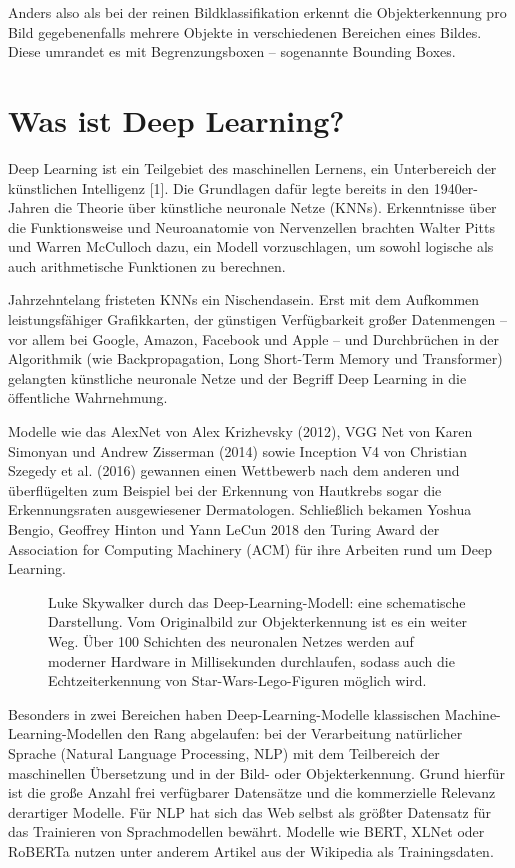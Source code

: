 Anders also als bei der reinen Bildklassifikation erkennt die Objekterkennung pro Bild gegebenenfalls mehrere Objekte in verschiedenen Bereichen eines Bildes. Diese umrandet es mit Begrenzungsboxen – sogenannte Bounding Boxes. 

\section{Was ist Deep Learning?}

Deep Learning ist ein Teilgebiet des maschinellen Lernens, ein Unterbereich der künstlichen Intelligenz [1]. Die Grundlagen dafür legte bereits in den 1940er-Jahren die Theorie über künstliche neuronale Netze (KNNs). Erkenntnisse über die Funktionsweise und Neuroanatomie von Nervenzellen brachten Walter Pitts und Warren McCulloch dazu, ein Modell vorzuschlagen, um sowohl logische als auch arithmetische Funktionen zu berechnen. 

Jahrzehntelang fristeten KNNs ein Nischendasein. Erst mit dem Aufkommen leistungsfähiger Grafikkarten, der günstigen Verfügbarkeit großer Datenmengen – vor allem bei Google, Amazon, Facebook und Apple – und Durchbrüchen in der Algorithmik (wie Backpropagation, Long Short-Term Memory und Transformer) gelangten künstliche neuronale Netze und der Begriff Deep Learning in die öffentliche Wahrnehmung. 

Modelle wie das AlexNet von Alex Krizhevsky (2012), VGG Net von Karen Simonyan und Andrew Zisserman (2014) sowie Inception V4 von Christian Szegedy et al. (2016) gewannen einen Wettbewerb nach dem anderen und überflügelten zum Beispiel bei der Erkennung von Hautkrebs sogar die Erkennungsraten ausgewiesener Dermatologen. Schließlich bekamen ­Yoshua Bengio, Geoffrey Hinton und Yann LeCun 2018 den Turing Award der Association for Computing Machinery (ACM) für ihre Arbeiten rund um Deep Learning. 


\begin{figure}
	
	
	\caption{Luke Skywalker durch das Deep-Learning-Modell: eine schematische Darstellung. Vom Originalbild zur Objekterkennung ist es ein weiter Weg. Über 100 Schichten des neuronalen Netzes werden auf moderner Hardware in Millisekunden durchlaufen, sodass auch die Echtzeiterkennung von Star-Wars-Lego-Figuren möglich wird.}
\end{figure} 


Besonders in zwei Bereichen haben Deep-Learning-Modelle klassischen Machine-Learning-Modellen den Rang abgelaufen: bei der Verarbeitung natürlicher Sprache (Natural Language Processing, NLP) mit dem Teilbereich der maschinellen Übersetzung und in der Bild- oder Objekterkennung. Grund hierfür ist die große Anzahl frei verfügbarer Datensätze und die kommerzielle Relevanz derartiger Modelle. Für NLP hat sich das Web selbst als größter Datensatz für das Trainieren von Sprachmodellen bewährt. Modelle wie BERT, XLNet oder RoBERTa nutzen unter anderem Artikel aus der Wikipedia als Trainingsdaten. 

